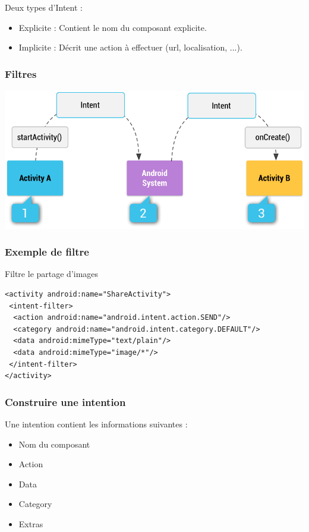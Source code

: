 \documentclass{beamer}
\begin{document}
\begin{frame}
\begin{block}{Deux types d'Intent :}
\begin{itemize}
\item Explicite : Contient le nom du composant explicite.
\item Implicite : Décrit une action à effectuer (url, localisation, ...).
\end{itemize}

\end{block}
\end{frame}

\begin{frame}
\frametitle{Filtres}
\begin{center}
\includegraphics[scale=0.3]{intent-filters2.png}
\end{center}
\end{frame}

\begin{frame}[fragile]
\frametitle{Exemple de filtre}
\begin{block}{Filtre le partage d'images}
\lstset{language=XML}
\begin{lstlisting}
<activity android:name="ShareActivity">
 <intent-filter>
  <action android:name="android.intent.action.SEND"/>
  <category android:name="android.intent.category.DEFAULT"/>
  <data android:mimeType="text/plain"/>
  <data android:mimeType="image/*"/>
 </intent-filter>
</activity>
\end{lstlisting}
\end{block}
\end{frame}

\begin{frame}
\frametitle{Construire une intention}
\begin{block}{Une intention contient les informations suivantes :}
\begin{itemize}
\item Nom du composant
\item Action
\item Data
\item Category
\item Extras
\end{itemize}
\end{block}
\end{frame}
\end{document}
